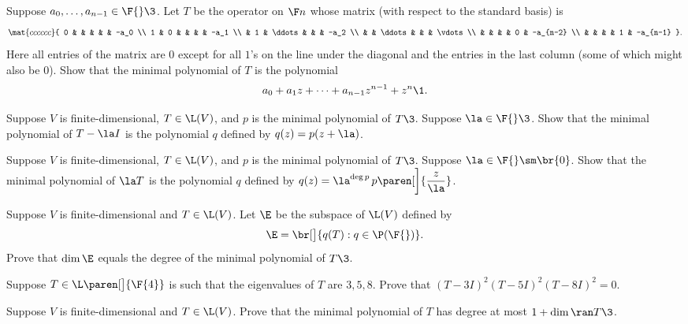 \exercise
Suppose $a_0, \dots, a_{n-1} \in \F{}\3$. Let $T$ be the operator on $\F n$ whose matrix (with respect to the standard basis) is
\label{8FTAneeded}
\[
\mat{cccccc}{
0 & & & & & -a_0 \\
1 & 0  & & & & -a_1 \\
& 1 & \ddots & & & -a_2 \\
& & \ddots & & & \vdots \\
& & & & 0 & -a_{n-2} \\
& & & & 1 & -a_{n-1} }.
\]
Here all entries of the matrix are $0$ except for all $1$'s on the line under the diagonal and the entries in the last column (some of which might also be $0$). Show that the minimal polynomial of $T$ is the polynomial
\[
a_0 + a_1 z + \cdots + a_{n-1} z^{n-1} + z^n\1.
\]


\exercise
Suppose $V$ is finite-dimensional, $T \in \L(V)$, and $p$ is the minimal polynomial of $T\3$. Suppose $\la \in \F{}\3$.
Show that the minimal polynomial of $T - \la I$ is the polynomial $q$ defined by $q(z) = p(z+\la)$.


\exercise
Suppose $V$ is finite-dimensional, $T \in \L(V)$, and $p$ is the minimal polynomial of $T\3$. Suppose
$\la \in \F{} \sm \br{0}$. Show that the minimal polynomial of $\la T$ is the polynomial $q$ defined by
$q(z) = \la^{\deg p} \, p\paren[\bigg]{\dfrac{z}{\la}}$.


\exercise
Suppose $V$ is finite-dimensional and $T \in \L(V)$. Let $\E$ be the subspace of $\L(V)$ defined by
\[
\E = \br[\big]{ q(T): q \in \P(\F{}) }.
\]
Prove that $\dim \E$ equals the degree of the minimal polynomial of $T\3$.


\exercise
Suppose $T \in \L\paren[\big]{\F{4}}$ is such that the eigenvalues of $T$ are $3, 5, 8$. Prove that
$
(T - 3I)^2 (T - 5I)^2 (T - 8 I)^2 = 0$.


\exercise
Suppose $V$ is finite-dimensional and $T \in \L(V)$. Prove that the minimal polynomial of $T$ has degree at most $1 + \dim \ran T\3$.


